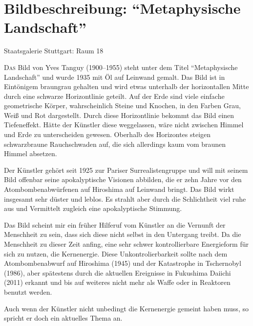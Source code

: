 \renewcommand{\BildName}{Metaphysische Landschaft}
\section{Bildbeschreibung: \enquote{\BildName}}
Staatsgalerie Stuttgart: Raum 18

\lettrine{D}{as} Bild von Yves Tanguy (1900--1955) steht unter dem Titel \enquote{\BildName} und wurde 1935 mit Öl auf
Leinwand gemalt.
Das Bild ist in Eintönigem braungrau gehalten und wird etwas unterhalb der horizontallen Mitte durch eine schwarze
Horizontlinie geteilt. Auf der Erde sind viele einfache geometrische Körper, wahrscheinlich Steine
und Knochen, in den
Farben Grau, Weiß und Rot dargestellt. Durch diese Horizontlinie bekommt das Bild einen Tiefeneffekt. Hätte der Künstler
diese weggelassen, wäre nicht zwischen Himmel und Erde zu unterscheiden gewesen.
Oberhalb des Horizontes steigen schwarzbraune Rauchschwaden auf, die sich allerdings kaum vom braunen Himmel absetzen.

Der Künstler gehört seit 1925 zur Pariser Surrealistengruppe und will mit seinem Bild offenbar seine apokalyptische
Visionen abbilden, die er zehn Jahre vor den Atombombenabwürfenen auf Hiroshima auf Leinwand bringt.
Das Bild wirkt insgesamt sehr düster und leblos. Es strahlt aber durch die Schlichtheit viel ruhe aus und Vermittelt
zugleich eine apokalyptische Stimmung.

Das Bild scheint mir ein früher Hilferuf vom Künstler an die Vernunft der Menschheit zu sein, dass sich diese
nicht selbst in den Untergang treibt.
Da die Menschheit zu dieser Zeit anfing, eine sehr schwer kontrollierbare Energieform für sich zu nutzen, die Kernenergie.
Diese Unkontrolierbarkeit sollte nach dem Atombombenabwurf auf Hiroshima (1945) und der Katastrophe in Tschernobyl (1986),
aber spätestens durch die aktuellen Ereignisse in Fukushima Daiichi (2011) erkannt und bis auf weiteres nicht mehr als
Waffe oder in Reaktoren benutzt werden.

Auch wenn der Künstler nicht unbedingt die Kernenergie gemeint haben muss, so spricht er doch ein aktuelles Thema an.
